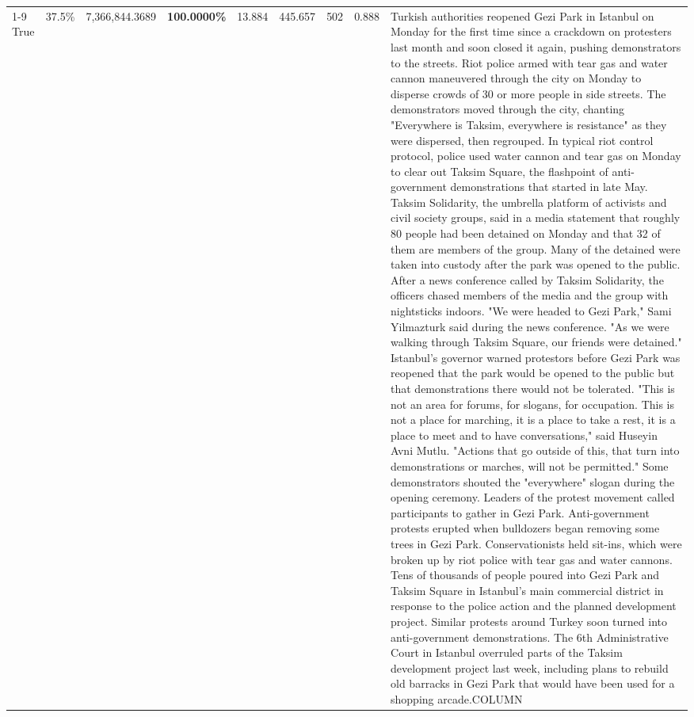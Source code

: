 \begin{table}[H]
\begin{tabular}{lllrlllll}
\cline{1-9}
True & 37.5\% & 7,366,844.3689 & \bfseries \color{red} 100.0000\% & 13.884 & 445.657 & 502 & 0.888 & Turkish authorities reopened Gezi Park in Istanbul on Monday for the first time since a crackdown on protesters last month and soon closed it again, pushing demonstrators to the streets. Riot police armed with tear gas and water cannon maneuvered through the city on Monday to disperse crowds of 30 or more people in side streets. The demonstrators moved through the city, chanting "Everywhere is Taksim, everywhere is resistance" as they were dispersed, then regrouped. In typical riot control protocol, police used water cannon and tear gas on Monday to clear out Taksim Square, the flashpoint of anti-government demonstrations that started in late May. Taksim Solidarity, the umbrella platform of activists and civil society groups, said in a media statement that roughly 80 people had been detained on Monday and that 32 of them are members of the group. Many of the detained were taken into custody after the park was opened to the public. After a news conference called by Taksim Solidarity, the officers chased members of the media and the group with nightsticks indoors. "We were headed to Gezi Park," Sami Yilmazturk said during the news conference. "As we were walking through Taksim Square, our friends were detained." Istanbul's governor warned protestors before Gezi Park was reopened that the park would be opened to the public but that demonstrations there would not be tolerated. "This is not an area for forums, for slogans, for occupation. This is not a place for marching, it is a place to take a rest, it is a place to meet and to have conversations," said Huseyin Avni Mutlu. "Actions that go outside of this, that turn into demonstrations or marches, will not be permitted." Some demonstrators shouted the "everywhere" slogan during the opening ceremony. Leaders of the protest movement called participants to gather in Gezi Park. Anti-government protests erupted when bulldozers began removing some trees in Gezi Park. Conservationists held sit-ins, which were broken up by riot police with tear gas and water cannons. Tens of thousands of people poured into Gezi Park and Taksim Square in Istanbul's main commercial district in response to the police action and the planned development project. Similar protests around Turkey soon turned into anti-government demonstrations. The 6th Administrative Court in Istanbul overruled parts of the Taksim development project last week, including plans to rebuild old barracks in Gezi Park that would have been used for a shopping arcade.COLUMN \\

\end{tabular}
\end{table}
